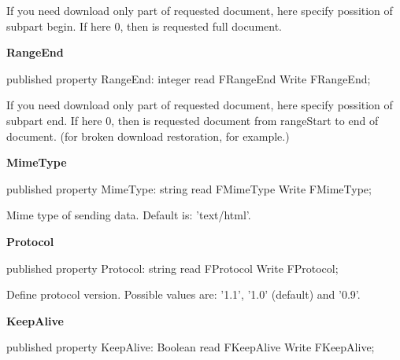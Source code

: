 \documentclass{report}
\newif\ifpdf
\begin{document}
\begin{list}{}
\begin{flushleft}
\ifpdf
\end{flushleft}
\fi


\par If you need download only part of requested document, here specify possition of subpart begin. If here 0, then is requested full document.\label{httpsend.THTTPSend-RangeEnd}
\item[\textbf{RangeEnd}\hfill]
\ifpdf
\begin{flushleft}
\fi
\begin{ttfamily}
published property RangeEnd: integer read FRangeEnd Write FRangeEnd;\end{ttfamily}

\ifpdf
\end{flushleft}
\fi


\par If you need download only part of requested document, here specify possition of subpart end. If here 0, then is requested document from rangeStart to end of document. (for broken download restoration, for example.)\label{httpsend.THTTPSend-MimeType}
\item[\textbf{MimeType}\hfill]
\ifpdf
\begin{flushleft}
\fi
\begin{ttfamily}
published property MimeType: string read FMimeType Write FMimeType;\end{ttfamily}

\ifpdf
\end{flushleft}
\fi


\par Mime type of sending data. Default is: 'text/html'.\label{httpsend.THTTPSend-Protocol}
\item[\textbf{Protocol}\hfill]
\ifpdf
\begin{flushleft}
\fi
\begin{ttfamily}
published property Protocol: string read FProtocol Write FProtocol;\end{ttfamily}

\ifpdf
\end{flushleft}
\fi


\par Define protocol version. Possible values are: '1.1', '1.0' (default) and '0.9'.\label{httpsend.THTTPSend-KeepAlive}
\item[\textbf{KeepAlive}\hfill]
\ifpdf
\begin{flushleft}
\fi
\begin{ttfamily}
published property KeepAlive: Boolean read FKeepAlive Write FKeepAlive;\end{ttfamily}


\end{flushleft}
\end{list}
\end{document}
